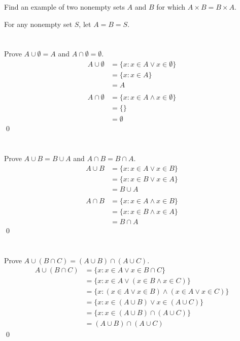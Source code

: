 Find an example of two nonempty sets $A$ and $B$ for which $A \times B = B \times A$.
\hr

For any nonempty set $S$, let $A = B = S$.

\section{}\label{sec:4}

Prove $A \cup \emptyset = A$ and $A \cap \emptyset = \emptyset$.
\hr
\begin{align*}
    A \cup \emptyset &= \{x : x \in A \lor x \in \emptyset\} \\
    &= \{x : x \in A\} \\
    &= A \\
    \\
    A \cap \emptyset &= \{x : x \in A \land x \in \emptyset\} \\
    &= \{\} \\
    &= \emptyset
\end{align*}\qed

\section{}\label{sec:5}

Prove $A \cup B = B \cup A$ and $A \cap B = B \cap A$.
\hr
\begin{align*}
    A \cup B &= \{x : x \in A \lor x \in B\} \\
    &= \{x : x \in B \lor x \in A\} \\
    &= B \cup A \\
    \\
    A \cap B &= \{x : x \in A \land x \in B\} \\
    &= \{x : x \in B \land x \in A\} \\
    &= B \cap A
\end{align*}\qed

\section{}\label{sec:6}

Prove $A \cup (B \cap C) = (A \cup B) \cap (A \cup C)$.
\hr
\begin{align*}
    A \cup (B \cap C) &= \{x : x \in A \lor x \in B \cap C\} \\
    &= \{x : x \in A \lor (x \in B \land x \in C)\} \\
    &= \{x : (x \in A \lor x \in B) \land (x \in A \lor x \in C)\} \\
    &= \{x : x \in (A \cup B) \lor x \in (A \cup C)\} \\
    &= \{x : x \in (A \cup B) \cap (A \cup C)\} \\
    &= (A \cup B) \cap (A \cup C)
\end{align*}\qed
\pagebreak
